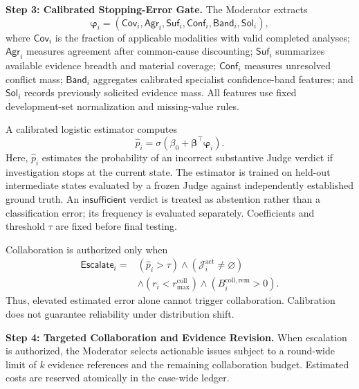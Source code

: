 \medskip
\noindent\textbf{Step 3: Calibrated
Stopping-Error Gate.}
The Moderator extracts
\begin{equation}
\boldsymbol{\varphi}_i=
(\mathsf{Cov}_i,\mathsf{Agr}_i,
\mathsf{Suf}_i,\mathsf{Conf}_i,
\mathsf{Band}_i,\mathsf{Sol}_i),
\label{eq:moderator-features}
\end{equation}
where $\mathsf{Cov}_i$ is the
fraction of applicable modalities
with valid completed analyses;
$\mathsf{Agr}_i$ measures agreement
after common-cause discounting;
$\mathsf{Suf}_i$ summarizes available
evidence breadth and material coverage;
$\mathsf{Conf}_i$ measures unresolved
conflict mass; $\mathsf{Band}_i$
aggregates calibrated specialist
confidence-band features; and
$\mathsf{Sol}_i$ records previously
solicited evidence mass. All features
use fixed development-set
normalization and missing-value rules.

A calibrated logistic estimator computes
\begin{equation}
\widehat p_i=
\sigma\!\left(
\beta_0+
\boldsymbol{\beta}^{\top}
\boldsymbol{\varphi}_i
\right).
\label{eq:stopping-error}
\end{equation}
Here, $\widehat p_i$ estimates the
probability of an incorrect substantive
Judge verdict if investigation stops
at the current state. The estimator
is trained on held-out intermediate
states evaluated by a frozen Judge
against independently established
ground truth. An
$\mathsf{insufficient}$ verdict is
treated as abstention rather than
a classification error; its frequency
is evaluated separately. Coefficients
and threshold $\tau$ are fixed before
final testing.

Collaboration is authorized only when
\begin{equation}
\begin{aligned}
\mathsf{Escalate}_i={}&
(\widehat p_i>\tau)
\land(\mathcal J_i^{\mathrm{act}}
\neq\varnothing)\\
&\land(r_i<r_{\max}^{\mathrm{coll}})
\land(B_i^{\mathrm{coll,rem}}>0).
\end{aligned}
\label{eq:collaboration-gate}
\end{equation}
Thus, elevated estimated error alone
cannot trigger collaboration.
Calibration does not guarantee
reliability under distribution shift.

\medskip
\noindent\textbf{Step 4: Targeted
Collaboration and Evidence Revision.}
When escalation is authorized, the
Moderator selects actionable issues
subject to a round-wide limit of
$k$ evidence references and the
remaining collaboration budget.
Estimated costs are reserved
atomically in the case-wide ledger.

